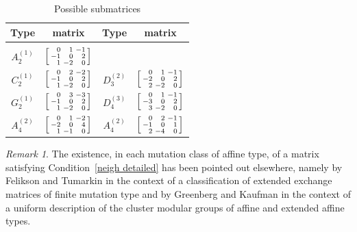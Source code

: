 \documentclass{amsart}
\theoremstyle{definition}
\theoremstyle{remark}
\newtheorem{remark}[proposition]{Remark}
\numberwithin{equation}{section}
\newcommand{\0}{{\mathbf{0}}}
\begin{document}
	\begin{table}
	\caption{Possible submatrices}
	\label{submat tab}	
	\begin{tabular}{|cc|cc|}
	Type & matrix & Type & matrix \\
	\hline & & & \\[-1ex]
	$A_{2}^{(1)}$ & $\begin{bsmallmatrix*}[r]
	0 & 1 & -1 \\
	-1 & 0 & 2 \\
	1 & -2 & 0
	\end{bsmallmatrix*}$ & & \\[4ex]
	$C_{2}^{(1)}$ & $\begin{bsmallmatrix*}[r]
	0 & 2 & -2 \\
	-1 & 0 & 2 \\
	1 & -2 & 0
	\end{bsmallmatrix*}$ &
	$D_{3}^{(2)}$ & $\begin{bsmallmatrix*}[r]
	0 & 1 & -1 \\
	-2 & 0 & 2 \\
	2 & -2 & 0
	\end{bsmallmatrix*}$ \\[4ex]
	$G_2^{(1)}$ & $\begin{bsmallmatrix*}[r]
	0 & 3 & -3 \\
	-1 & 0 & 2 \\
	1 & -2 & 0
	\end{bsmallmatrix*}$ &
	$D_4^{(3)}$ & $\begin{bsmallmatrix*}[r]
	0 & 1 & -1 \\
	-3 & 0 & 2 \\
	3 & -2 & 0
	\end{bsmallmatrix*}$ \\[4ex]
	$A_{4}^{(2)}$ & $\begin{bsmallmatrix*}[r]
	0 & 1 & -2 \\
	-2 & 0 & 4 \\
	1 & -1 & 0
	\end{bsmallmatrix*}$ &
	$A_{4}^{(2)}$ & $\begin{bsmallmatrix*}[r]
	0 & 2 & -1 \\
	-1 & 0 & 1 \\
	2 & -4 & 0
	\end{bsmallmatrix*}$ 
	\end{tabular}
	\end{table}

\begin{remark}\label{related remark}
The existence, in each mutation class of affine type, of a matrix satisfying Condition~\ref{neigh detailed} 
has been pointed out elsewhere, namely by Felikson and Tumarkin \cite{FeTuCoeff} in the context of a classification of extended exchange matrices of finite mutation type and by Greenberg and Kaufman \cite{GreenbergKaufman} in the context of a uniform description of the cluster modular groups of affine and extended affine types.  
\end{remark}
\end{document}
